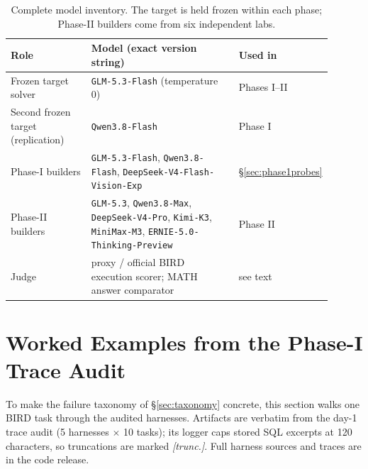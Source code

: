 \begin{table}[h]
\centering
\small
\begin{tabular}{p{0.26\linewidth}p{0.50\linewidth}p{0.14\linewidth}}
\toprule
Role & Model (exact version string) & Used in \\
\midrule
Frozen target solver & \texttt{GLM-5.3-Flash} (temperature 0) & Phases I--II \\
Second frozen target (replication) & \texttt{Qwen3.8-Flash} & Phase I \\
Phase-I builders & \texttt{GLM-5.3-Flash}, \texttt{Qwen3.8-Flash},
\texttt{DeepSeek-V4-Flash-Vision-Exp} & \S\ref{sec:phase1probes} \\
Phase-II builders & \texttt{GLM-5.3}, \texttt{Qwen3.8-Max},
\texttt{DeepSeek-V4-Pro}, \texttt{Kimi-K3}, \texttt{MiniMax-M3},
\texttt{ERNIE-5.0-Thinking-Preview} & Phase II \\
Judge & proxy / official BIRD execution scorer; MATH answer comparator & see text \\
\bottomrule
\end{tabular}
\caption{Complete model inventory. The target is held frozen within each
phase; Phase-II builders come from six independent labs.}
\label{tab:models}
\end{table}

\section{Worked Examples from the Phase-I Trace Audit}\label{app:examples}

To make the failure taxonomy of \S\ref{sec:taxonomy} concrete, this section
walks one BIRD task through the audited harnesses. Artifacts are verbatim
from the day-1 trace audit (5 harnesses $\times$ 10 tasks); its logger caps
stored SQL excerpts at 120 characters, so truncations are marked
\emph{[trunc.]}. Full harness sources and traces are in the code release.

